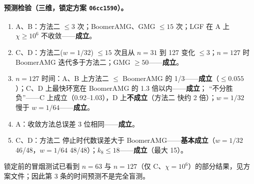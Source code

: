 \documentclass[11pt,a4paper]{ctexart}
\newcommand{\Mtwo}{方法二}
\begin{document}
\paragraph{预测检验（三维，锁定方案 \texttt{06cc1590}）。}
\begin{enumerate}
\item A、B：\Mtwo{} $\le3$ 次；BoomerAMG、GMG $\le15$ 次；LGF 在 A 上 $\chi\ge10^6$ 不收敛——\textbf{成立}。
\item C、D：\Mtwo{}($w=1/32$) $\le15$ 次且从 $n=31$ 到 127 变化 $\le3$；$n=127$ 时 BoomerAMG 迭代多于\Mtwo{}；GMG $\ge50$——\textbf{成立}。
\item $n=127$ 时间：A、B 上\Mtwo{} $\le$ BoomerAMG 的 1/3——\textbf{成立}（$\le0.055$）；C、D 上最快环宽在 BoomerAMG 的 1.3 倍以内——\textbf{成立}；
  “不分胜负”——C 上成立（0.92--1.03），D 上\textbf{不成立}（\Mtwo{} 快约 2 倍）；$w=1/32$ 慢于 $w=1/64$——\textbf{成立}。
\item A：收敛方法总误差 3 位相同——\textbf{成立}。
\item C、D：\Mtwo{} 停止时代数误差大于 BoomerAMG——\textbf{基本成立}（$w=1/32$ 46/48，$w=1/64$ 48/48）；$k_8\le18$——\textbf{成立}（最大 15）。
\end{enumerate}
锁定前的冒烟测试已看到 $n=63$ 与 $n=127$（仅 C、$\chi=10^6$）的部分结果，见方案文件；因此第 3 条的时间预测不是完全盲测。
\end{document}
